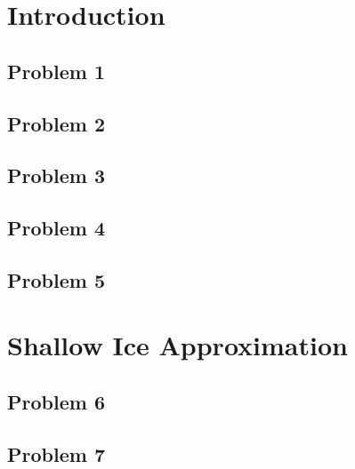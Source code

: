 \documentclass[11pt,a4paper,twoside,norsk]{article}
\begin{document}
\maketitle

\begin{abstract}
    
\end{abstract}

\section{Introduction}%
\label{sec:introduction}


\subsection*{Problem 1}


\subsection*{Problem 2}


\subsection*{Problem 3}


\subsection*{Problem 4}


\subsection*{Problem 5}


\section{Shallow Ice Approximation}


\subsection*{Problem 6}


\subsection*{Problem 7}

\end{document}
